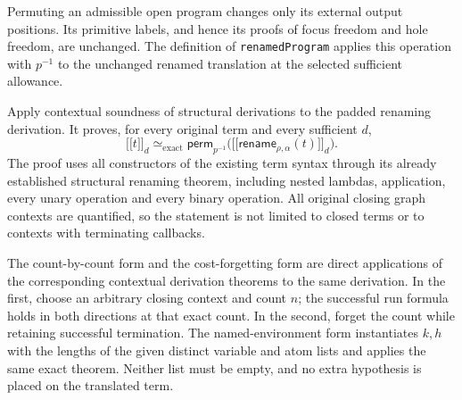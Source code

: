 
Permuting an admissible open program changes only its external output
positions. Its primitive labels, and hence its proofs of focus freedom and
hole freedom, are unchanged. The definition of \texttt{renamedProgram}
applies this operation with $p^{-1}$ to the unchanged renamed translation
at the selected sufficient allowance.


Apply contextual soundness of structural derivations to the padded renaming
derivation. It proves, for every original term and every sufficient $d$,
\[
 \lbrack\!\lbrack t\rbrack\!\rbrack_d
 \simeq_{\mathrm{exact}}
 \mathsf{perm}_{p^{-1}}
   \bigl(\lbrack\!\lbrack \mathsf{rename}_{\rho,\alpha}(t)\rbrack\!\rbrack_d\bigr).
\]
The proof uses all constructors of the existing term syntax through its
already established structural renaming theorem, including nested lambdas,
application, every unary operation and every binary operation. All original
closing graph contexts are quantified, so the statement is not limited to
closed terms or to contexts with terminating callbacks.


The count-by-count form and the cost-forgetting form are direct applications
of the corresponding contextual derivation theorems to the same derivation.
In the first, choose an arbitrary closing context and count $n$; the successful
run formula holds in both directions at that exact count. In the second,
forget the count while retaining successful termination. The named-environment
form instantiates $k,h$ with the lengths of the given distinct variable and
atom lists and applies the same exact theorem. Neither list must be empty,
and no extra hypothesis is placed on the translated term.


